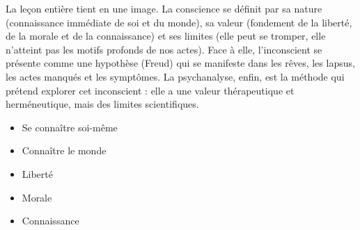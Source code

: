 \documentclass[11pt]{article}
\newcounter{popsec}
\newcounter{popsub}
\newcommand{\courssub}[1]{%
  \stepcounter{popsub}%
  \par\vspace{9pt}\noindent{\popxbold\fontsize{11.5}{13}\selectfont\color{popink}{\color{poporange}\thepopsec.\thepopsub}\hspace{6pt}#1}\par\nopagebreak\vspace{4pt}
}
\begin{document}
\courssub{Carte mentale de synthèse}

La leçon entière tient en une image. La conscience se définit par sa nature (connaissance immédiate de soi et du monde), sa valeur (fondement de la liberté, de la morale et de la connaissance) et ses limites (elle peut se tromper, elle n'atteint pas les motifs profonds de nos actes). Face à elle, l'inconscient se présente comme une hypothèse (Freud) qui se manifeste dans les rêves, les lapsus, les actes manqués et les symptômes. La psychanalyse, enfin, est la méthode qui prétend explorer cet inconscient : elle a une valeur thérapeutique et herméneutique, mais des limites scientifiques.

\begin{popfigure}
\begin{center}
\begin{center}\end{center}
\vspace{-2pt}
\begin{tcbraster}[raster columns=3,raster equal height=rows,raster column skip=6pt,raster row skip=6pt,enhanced,blankest]
\begin{tcolorbox}[enhanced,colback=white,colframe=popgreen,boxrule=0.9pt,arc=3pt,title={Nature de la conscience},fonttitle=\bfseries\scriptsize,coltitle=white,colbacktitle=popgreen,left=4pt,right=4pt,top=2pt,bottom=2pt,boxsep=1pt,toptitle=1.5pt,bottomtitle=1.5pt,halign=left]
\begin{itemize}[nosep,leftmargin=*,itemsep=1pt,font=\scriptsize]
\item Se connaître soi-même
\item Connaître le monde
\end{itemize}
\end{tcolorbox}
\begin{tcolorbox}[enhanced,colback=white,colframe=popgreen!70,boxrule=0.9pt,arc=3pt,title={Valeur de la conscience},fonttitle=\bfseries\scriptsize,coltitle=white,colbacktitle=popgreen!70,left=4pt,right=4pt,top=2pt,bottom=2pt,boxsep=1pt,toptitle=1.5pt,bottomtitle=1.5pt,halign=left]
\begin{itemize}[nosep,leftmargin=*,itemsep=1pt,font=\scriptsize]
\item Liberté
\item Morale
\item Connaissance
\end{itemize}
\end{tcolorbox}

\end{tcbraster}
\end{center}
\end{popfigure}
\end{document}
